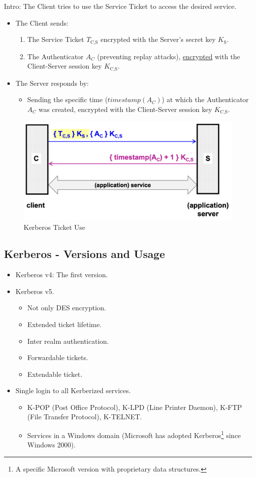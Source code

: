 Intro: The Client tries to use the Service Ticket to access the desired service.
\begin{itemize}
    \item The Client sends:
    \begin{enumerate}
        \item The Service Ticket $T_{\text{C,S}}$ encrypted with the Server's secret key $K_{\text{S}}$.
        \item The Authenticator $A_C$ (preventing replay attacks), \underline{encrypted} with the Client-Server session key $K_{\text{C,S}}$.
    \end{enumerate}
    \item The Server responds by:
    \begin{itemize}
        \item Sending the specific time ($timestamp(A_C)$) at which the Authenticator $A_C$ was created, encrypted with the Client-Server session key $K_{\text{C,S}}$.
    \end{itemize}
\end{itemize}

\begin{figure}[H]
    \centering
    \includegraphics[width=0.5\linewidth]{Images/Authentication/kerticketuse.png}
    \caption{Kerberos Ticket Use}
\end{figure}

\subsection*{Kerberos - Versions and Usage}
\begin{itemize}
    \item Kerberos v4: The first version.
    \item Kerberos v5.
    \begin{itemize}
        \item Not only DES encryption.
        \item Extended ticket lifetime.
        \item Inter realm authentication.
        \item Forwardable tickets.
        \item Extendable ticket.
    \end{itemize}
    \item Single login to all Kerberized services.
    \begin{itemize}
        \item K-POP (Post Office Protocol), K-LPD (Line Printer Daemon), K-FTP (File Transfer Protocol), K-TELNET.
        \item Services in a Windows domain (Microsoft has adopted Kerberos\footnote{A specific Microsoft version with proprietary data structures.} since Windows 2000).    \end{itemize}
\end{itemize}

